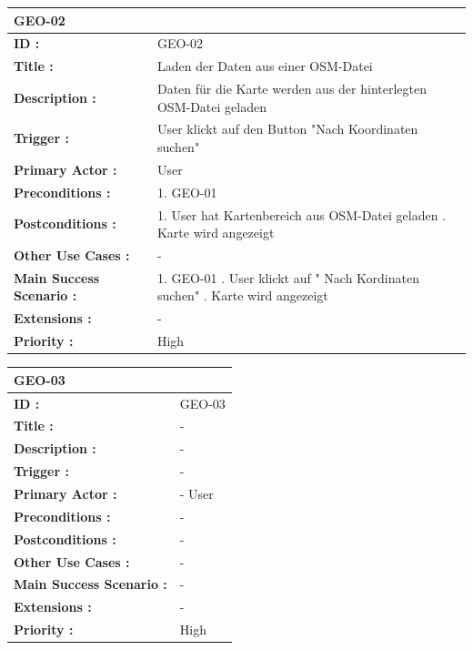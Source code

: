 	\begin{table}[H]
		\begin{tabular}{|p{8cm}|p{8cm}|}
			\hline
			\textbf{GEO-02 } \\ 
			\hline
			\textbf{ID :}\centering & GEO-02  \\ \hline 
			\textbf{Title :}\centering & Laden der Daten aus einer OSM-Datei \\ \hline 
			\textbf{Description :}\centering & Daten für die Karte werden aus der hinterlegten OSM-Datei geladen \\ \hline 
			\textbf{Trigger :}\centering & User klickt auf den Button "Nach Koordinaten suchen" \\ \hline 
			\textbf{Primary Actor :} \centering & User \\ \hline 
			\textbf{Preconditions :}\centering & 
			1. GEO-01\\ \hline 
			\textbf{Postconditions :}\centering & 
			1. User hat Kartenbereich aus OSM-Datei geladen \newline
			2. Karte wird angezeigt \\ \hline
			\textbf{Other Use Cases :}\centering & - \\ \hline  
			\textbf{Main Success Scenario :}\centering & 
			1. GEO-01 \newline
			2. User klickt auf " Nach Kordinaten suchen" \newline
			3. Karte wird angezeigt \\ \hline  
			\textbf{Extensions :}\centering & - \\ \hline  
			\textbf{Priority :}\centering & High \\ \hline  
		\end{tabular}
	\end{table}
	
	\begin{table}[H]
		\begin{tabular}{|p{8cm}|p{8cm}|}
			\hline
			\textbf{GEO-03 } \\ 
			\hline
			\textbf{ID :}\centering & GEO-03  \\ \hline 
			\textbf{Title :}\centering & -  \\ \hline 
			\textbf{Description :}\centering & -  \\ \hline 
			\textbf{Trigger :}\centering & -  \\ \hline 
			\textbf{Primary Actor :} \centering & - User \\ \hline 
			\textbf{Preconditions :}\centering & - \\ \hline 
			\textbf{Postconditions :}\centering & - \\ \hline
			\textbf{Other Use Cases :}\centering & - \\ \hline  
			\textbf{Main Success Scenario :}\centering & -\\ \hline  
			\textbf{Extensions :}\centering & - \\ \hline  
			\textbf{Priority :}\centering & High \\ \hline  
		\end{tabular}
	\end{table}
	
